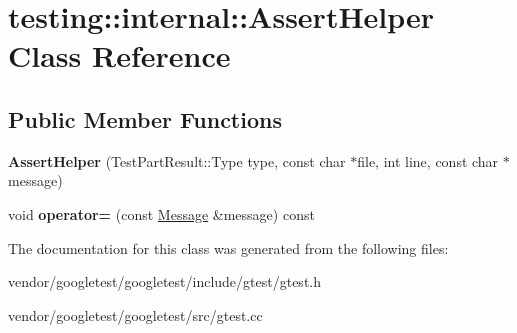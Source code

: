 \hypertarget{classtesting_1_1internal_1_1_assert_helper}{}\section{testing\+:\+:internal\+:\+:Assert\+Helper Class Reference}
\label{classtesting_1_1internal_1_1_assert_helper}
\subsection*{Public Member Functions}
\begin{DoxyCompactItemize}
\item 
\mbox{\label{classtesting_1_1internal_1_1_assert_helper_ac2c9334518fd4087189b4505567a3c90}} 
{\bfseries Assert\+Helper} (Test\+Part\+Result\+::\+Type type, const char $\ast$file, int line, const char $\ast$message)
\item 
\mbox{\label{classtesting_1_1internal_1_1_assert_helper_a97bf22d786131ab7baa86b97a27aeb4d}} 
void {\bfseries operator=} (const \mbox{\hyperlink{classtesting_1_1_message}{Message}} \&message) const
\end{DoxyCompactItemize}


The documentation for this class was generated from the following files\+:\begin{DoxyCompactItemize}
\item 
vendor/googletest/googletest/include/gtest/gtest.\+h\item 
vendor/googletest/googletest/src/gtest.\+cc\end{DoxyCompactItemize}
